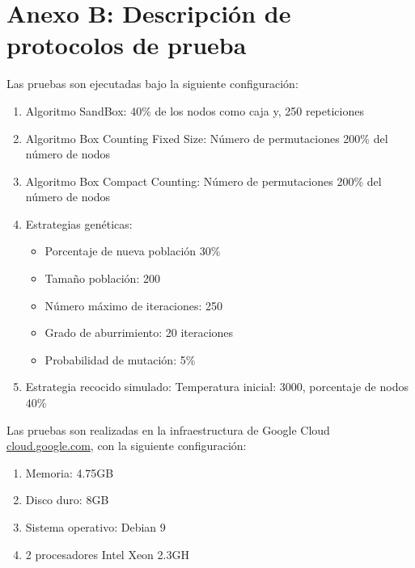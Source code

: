 \section*{Anexo B: Descripción de protocolos de prueba}
\label{AnexoB}

Las pruebas son ejecutadas bajo la siguiente configuración:

\begin{enumerate}
    \item Algoritmo SandBox: 40\% de los nodos como caja y, 250 repeticiones
    \item Algoritmo Box Counting Fixed Size: Número de permutaciones 200\% del número de nodos
    \item Algoritmo Box Compact Counting: Número de permutaciones 200\% del número de nodos
    \item Estrategias genéticas:
    \begin{itemize}
        \item Porcentaje de nueva población 30\%
        \item Tamaño población: 200
        \item Número máximo de iteraciones: 250
        \item Grado de aburrimiento: 20 iteraciones
        \item Probabilidad de mutación: 5\%
    \end{itemize}
    \item Estrategia recocido simulado: Temperatura inicial: 3000, porcentaje de nodos 40\%
\end{enumerate}

Las pruebas son realizadas en la infraestructura de Google Cloud \url{cloud.google.com}, con la siguiente configuración:

\begin{enumerate}
    \item Memoria: 4.75GB
    \item Disco duro: 8GB
    \item Sistema operativo: Debian 9
    \item 2 procesadores Intel Xeon 2.3GH
\end{enumerate}